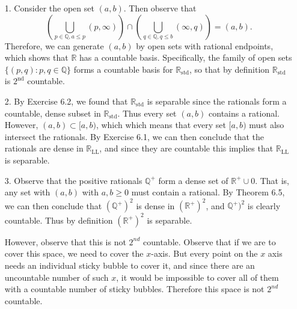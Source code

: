 \documentclass[a4paper,12pt,twoside]{hmcpset}
\begin{document}
\begin{solution}
    \begin{itemize}
        \item[1.] 
        Consider the open set $(a, b)$. Then observe that 
        \[
           \left(\bigcup\limits_{p \in \mathbb{Q}, a \le p}(p, \infty)\right) 
           \cap
           \left(\bigcup\limits_{q \in \mathbb{Q}, q \le b}(\infty, q)\right)
           = 
           (a, b).  
        \]
        Therefore, we can generate $(a, b)$ by open sets with rational
        endpoints, which shows that $\mathbb{R}$ has a countable basis. 
        Specifically, the family of open sets $\{(p,q) : p, q \in
        \mathbb{Q}\}$ forms a countable basis for
        $\mathbb{R}_\text{std}$, so that by definition
        $\mathbb{R}_\text{std}$ is $2^\text{nd}$ countable.
    
        \item[2.] 
        By Exercise 6.2, we found that
        $\mathbb{R}_\text{std}$ is separable since the rationals form a
        countable, dense subset in $\mathbb{R}_\text{std}$. Thus every set
        $(a, b)$ contains a rational.
        However, $(a, b) \subset [a, b)$, which
        which means that every set $[a, b)$ must also intersect the
        rationals. By Exercise 6.1, we can then conclude that the
        rationals are dense in $\mathbb{R}_{\text{LL}}$, and since they
        are countable this implies that $\mathbb{R}_\text{LL}$ is
        separable.
        
        \item[3.] Observe that the positive rationals $\mathbb{Q}^+$ form
        a dense set of $\mathbb{R}^+\cup{0}$. That is, any set with $(a, b)$ with
        $a, b \ge 0$ must contain a rational. By Theorem 6.5, we can then
        conclude that $(\mathbb{Q}^+)^2$ is dense in $(\mathbb{R}^+)^2$,
        and $\mathbb{Q}^+)^2$ is clearly countable. Thus by definition
        $(\mathbb{R}^+)^2$ is separable. 
    
        However, observe that this is not $2^{nd}$ countable. Observe that
        if we are to cover this space, we need to cover the $x$-axis.
        But every point on the $x$ axis needs an individual sticky
        bubble to cover it, and since there are an uncountable number of
        such $x$, it would be impossible to cover all of them with a
        countable number of sticky bubbles. Therefore this space is not
        $2^{nd}$ countable. 
    
        
    \end{itemize}
\end{solution}
\end{document}
